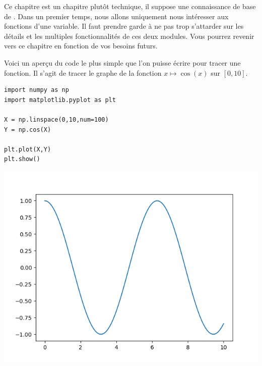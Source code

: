 \documentclass[11pt,class=report,crop=false]{standalone}
\begin{document}





\bigskip

Ce chapitre est un chapitre plutôt technique, il suppose une connaissance de base de \Python.
Dans un premier temps, nous allons uniquement nous intéresser aux fonctions d'une variable.
Il faut prendre garde à ne pas trop s'attarder sur les détails et les multiples fonctionnalités de ces deux modules. Vous pourrez revenir vers ce chapitre en fonction de vos besoins futurs.

Voici un aperçu du code le plus simple que l'on puisse écrire pour tracer une fonction.
Il s'agit de tracer le graphe de la fonction $x \mapsto \cos(x)$ sur $[0,10]$.

\begin{minipage}{0.45\textwidth}
\begin{lstlisting}
import numpy as np
import matplotlib.pyplot as plt

X = np.linspace(0,10,num=100)
Y = np.cos(X)

plt.plot(X,Y)
plt.show()
\end{lstlisting}
\end{minipage}
\begin{minipage}{0.49\textwidth}
\begin{center}
\includegraphics[scale=\myscale,scale=0.55]{figures/pythonx-intro}
\end{center}
\end{minipage}
\end{document}

